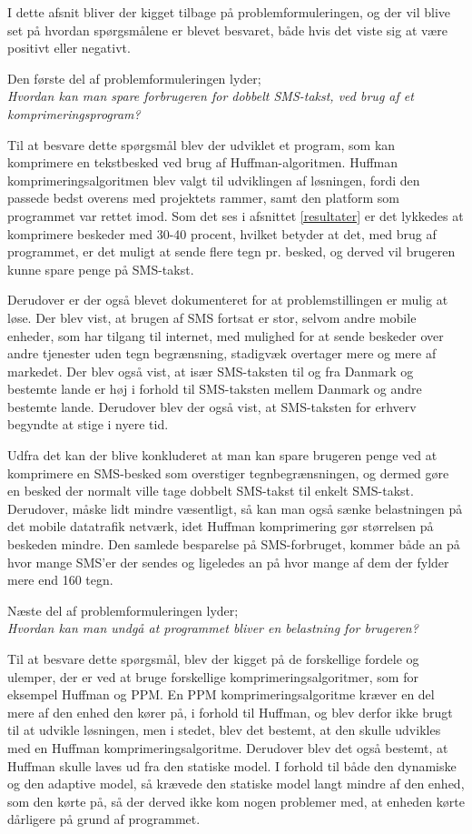 I dette afsnit bliver der kigget tilbage på problemformuleringen, og der vil blive set på hvordan spørgsmålene er blevet besvaret, både hvis det viste sig at være positivt eller negativt.

Den første del af problemformuleringen lyder;\\
\emph{Hvordan kan man spare forbrugeren for dobbelt SMS-takst, ved brug af et komprimeringsprogram?}
 
Til at besvare dette spørgsmål blev der udviklet et program, som kan komprimere en tekstbesked ved brug af Huffman-algoritmen. Huffman komprimeringsalgoritmen blev valgt til udviklingen af løsningen, fordi den passede bedst overens med projektets rammer, samt den platform som programmet var rettet imod. Som det ses i afsnittet \ref{resultater} er det lykkedes at komprimere beskeder med 30-40 procent, hvilket betyder at det, med brug af programmet, er det muligt at sende flere tegn pr. besked, og derved vil brugeren kunne spare penge på SMS-takst.
 
Derudover er der også blevet dokumenteret for at problemstillingen er mulig at løse. Der blev vist, at brugen af SMS fortsat er stor, selvom andre mobile enheder, som har tilgang til internet, med mulighed for at sende beskeder over andre tjenester uden tegn begrænsning, stadigvæk overtager mere og mere af markedet. Der blev også vist, at især SMS-taksten til og fra Danmark og bestemte lande er høj i forhold til SMS-taksten mellem Danmark og andre bestemte lande. Derudover blev der også vist, at SMS-taksten for erhverv begyndte at stige i nyere tid.
 
Udfra det kan der blive konkluderet at man kan spare brugeren penge ved at komprimere en SMS-besked som overstiger tegnbegrænsningen, og dermed gøre en besked der normalt ville tage dobbelt SMS-takst til enkelt SMS-takst. Derudover, måske lidt mindre væsentligt, så kan man også sænke belastningen på det mobile datatrafik netværk, idet Huffman komprimering gør størrelsen på beskeden mindre. Den samlede besparelse på SMS-forbruget, kommer både an på hvor mange SMS'er der sendes og ligeledes an på hvor mange af dem der fylder mere end 160 tegn.

 
Næste del af problemformuleringen lyder;\\
\emph{Hvordan kan man undgå at programmet bliver en belastning for brugeren?} 

Til at besvare dette spørgsmål, blev der kigget på de forskellige fordele og ulemper, der er ved at bruge forskellige komprimeringsalgoritmer, som for eksempel Huffman og PPM. En PPM komprimeringsalgoritme kræver en del mere af den enhed den kører på, i forhold til Huffman, og blev derfor ikke brugt til at udvikle løsningen, men i stedet, blev det bestemt, at den skulle udvikles med en Huffman komprimeringsalgoritme. Derudover blev det også bestemt, at Huffman skulle laves ud fra den statiske model. I forhold til både den dynamiske og den adaptive model, så krævede den statiske model langt mindre af den enhed, som den kørte på, så der derved ikke kom nogen problemer med, at enheden kørte dårligere på grund af programmet. 

